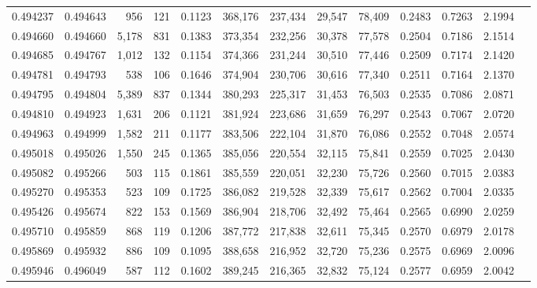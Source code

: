 \begin{tabular}{rrrrrrrrrrrrr}
0.494237 & 0.494643 &   956 &   121 &                                     0.1123 & 368,176 & 237,434 &  29,547 &  78,409 & 0.2483 & 0.7263 & 2.1994 \\
0.494660 & 0.494660 & 5,178 &   831 &                                     0.1383 & 373,354 & 232,256 &  30,378 &  77,578 & 0.2504 & 0.7186 & 2.1514 \\
0.494685 & 0.494767 & 1,012 &   132 &                                     0.1154 & 374,366 & 231,244 &  30,510 &  77,446 & 0.2509 & 0.7174 & 2.1420 \\
0.494781 & 0.494793 &   538 &   106 &                                     0.1646 & 374,904 & 230,706 &  30,616 &  77,340 & 0.2511 & 0.7164 & 2.1370 \\
0.494795 & 0.494804 & 5,389 &   837 &                                     0.1344 & 380,293 & 225,317 &  31,453 &  76,503 & 0.2535 & 0.7086 & 2.0871 \\
0.494810 & 0.494923 & 1,631 &   206 &                                     0.1121 & 381,924 & 223,686 &  31,659 &  76,297 & 0.2543 & 0.7067 & 2.0720 \\
0.494963 & 0.494999 & 1,582 &   211 &                                     0.1177 & 383,506 & 222,104 &  31,870 &  76,086 & 0.2552 & 0.7048 & 2.0574 \\
0.495018 & 0.495026 & 1,550 &   245 &                                     0.1365 & 385,056 & 220,554 &  32,115 &  75,841 & 0.2559 & 0.7025 & 2.0430 \\
0.495082 & 0.495266 &   503 &   115 &                                     0.1861 & 385,559 & 220,051 &  32,230 &  75,726 & 0.2560 & 0.7015 & 2.0383 \\
0.495270 & 0.495353 &   523 &   109 &                                     0.1725 & 386,082 & 219,528 &  32,339 &  75,617 & 0.2562 & 0.7004 & 2.0335 \\
0.495426 & 0.495674 &   822 &   153 &                                     0.1569 & 386,904 & 218,706 &  32,492 &  75,464 & 0.2565 & 0.6990 & 2.0259 \\
0.495710 & 0.495859 &   868 &   119 &                                     0.1206 & 387,772 & 217,838 &  32,611 &  75,345 & 0.2570 & 0.6979 & 2.0178 \\
0.495869 & 0.495932 &   886 &   109 &                                     0.1095 & 388,658 & 216,952 &  32,720 &  75,236 & 0.2575 & 0.6969 & 2.0096 \\
0.495946 & 0.496049 &   587 &   112 &                                     0.1602 & 389,245 & 216,365 &  32,832 &  75,124 & 0.2577 & 0.6959 & 2.0042 \\

\end{tabular}
